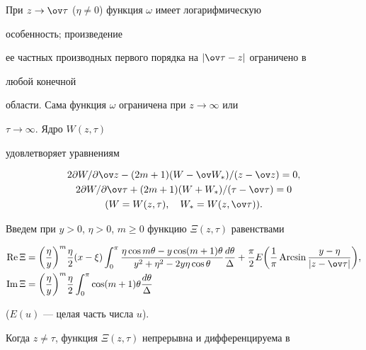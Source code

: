  


При $z\to\ov\tau$ ($\eta\ne 0$) функция $\omega$ имеет логарифмическую 


особенность; произведение 


ее частных производных первого порядка на $|\ov \tau-z|$ ограничено в 


любой конечной 


области. Сама функция $\omega$ ограничена при $z\to\infty$ или 


$\tau\to\infty$. Ядро $W(z,\tau)$ 


удовлетворяет уравнениям 


\begin{gather} 


2\partial W/\partial\ov z-(2m+1)(W-\ov W_*)/(z-\ov z)=0,\\ 


2\partial W/\partial\ov\tau+(2m+1)(W+W_*)/(\tau-\ov\tau)=0\\ 


(W=W(z,\tau),\quad W_*=W(z,\ov\tau)).\notag 


\end{gather} 


 


Введем при $y>0$, $\eta>0$, $m\ge 0$ функцию $\Xi(z,\tau)$ равенствами 


\begin{align*} 


\re\Xi&=\biggl(\frac{\eta}{y}\biggr)^m\frac{\eta}{2}(x-\xi) 


\int^\pi_0 


\frac{\eta\cos m\theta-y\cos(m+1)\theta} 


{y^2+\eta^2-2y\eta\cos\theta}\frac{d\theta}{\Delta}+ 


\frac{\pi}{2}E\biggl(\frac{1}{\pi}\Arcsin 


\frac{y-\eta}{|z-\ov\tau|}\biggr),\\ 


\im\Xi&=\biggl(\frac{\eta}{y}\biggr)^m\frac{\eta}{2} 


\int^\pi_0 \cos(m+1)\theta\frac{d\theta}{\Delta} 


\end{align*} 


($E(u)$ --- целая часть числа $u$). 


 


Когда $z\ne\tau$, функция $\Xi(z,\tau)$ непрерывна и дифференцируема в 


